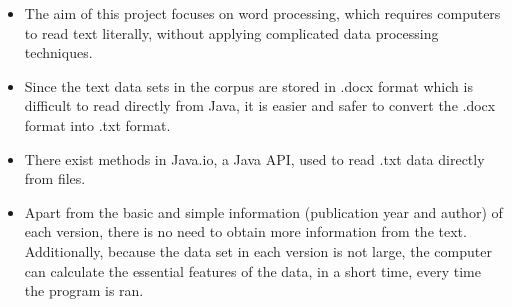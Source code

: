 \begin{itemize}
	\item \textbf{} The aim of this project focuses on word processing, which requires computers to read text literally, without applying complicated data processing techniques.
	\item \textbf{} Since the text data sets in the corpus are stored in .docx format which is difficult to read directly from Java, it is easier and safer to convert the .docx format into .txt format.
	\item \textbf{} There exist methods in Java.io, a Java API, used to read .txt data directly from files.
	\item \textbf{} Apart from the basic and simple information (publication year and author) of each version, there is no need to obtain more information from the text. Additionally, because the data set in each version is not large, the computer can calculate the essential features of the data, in a short time, every time the program is ran. 
\end{itemize}


